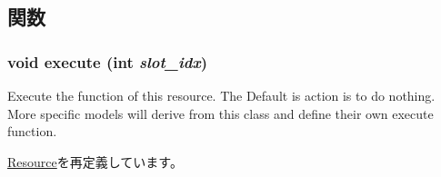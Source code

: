 \subsection{関数}
\hypertarget{classUseDefUnit_a7b7fff82f8c9cbdb02add1346f60bb9e}{
\subsubsection[{execute}]{\setlength{\rightskip}{0pt plus 5cm}void execute (int {\em slot\_\-idx})}}
\label{classUseDefUnit_a7b7fff82f8c9cbdb02add1346f60bb9e}
Execute the function of this resource. The Default is action is to do nothing. More specific models will derive from this class and define their own execute function. 

\hyperlink{classResource_a39af49c5568d1db3f53c12d7d6914c32}{Resource}を再定義しています。


